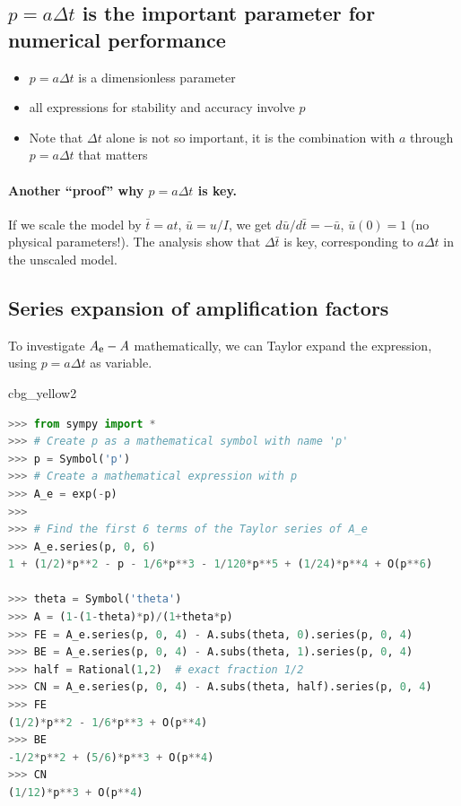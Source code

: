 \documentclass[%
oneside,                 %
final,                   %
10pt]{article}
\newenvironment{_cod_tight}[1]{
   \def\FrameCommand{\colorbox{#1}}
   \FrameRule0.6pt\MakeFramed {\FrameRestore}\vskip3mm}
   {\vskip0mm\endMakeFramed}
\newenvironment{cod}[1]{
\bgroup\rmfamily
\fboxsep=0mm\relax
\begin{_cod_tight}{#1}
\list{}{\parsep=-2mm\parskip=0mm\topsep=0pt\leftmargin=2mm
\rightmargin=2\leftmargin\leftmargin=4pt\relax}
\item\relax}
{\endlist\end{_cod_tight}\egroup}
\begin{document}
\subsection*{$p=a\Delta t$ is the important parameter for numerical performance}

\begin{itemize}
 \item $p=a\Delta t$ is a dimensionless parameter

 \item all expressions for stability and accuracy involve $p$

 \item Note that $\Delta t$ alone is not so important, it is the
   combination with $a$ through $p=a\Delta t$ that matters
\end{itemize}

\noindent

\paragraph{Another ``proof'' why $p=a\Delta t$ is key.}
If we scale the model
by $\bar t=at$, $\bar u=u/I$, we get
$d\bar u/d\bar t = -\bar u$, $\bar u(0)=1$ (no physical parameters!).
The analysis show that $\Delta \bar t$ is key, corresponding to
$a\Delta t$ in the unscaled model.



\subsection*{Series expansion of amplification factors}

To investigate $\Aex - A$ mathematically, we
can Taylor expand the expression, using $p=a\Delta t$ as variable.

\begin{cod}{cbg_yellow2}\begin{lstlisting}[language=Python,style=simple,xleftmargin=2mm]
>>> from sympy import *
>>> # Create p as a mathematical symbol with name 'p'
>>> p = Symbol('p')
>>> # Create a mathematical expression with p
>>> A_e = exp(-p)
>>>
>>> # Find the first 6 terms of the Taylor series of A_e
>>> A_e.series(p, 0, 6)
1 + (1/2)*p**2 - p - 1/6*p**3 - 1/120*p**5 + (1/24)*p**4 + O(p**6)

>>> theta = Symbol('theta')
>>> A = (1-(1-theta)*p)/(1+theta*p)
>>> FE = A_e.series(p, 0, 4) - A.subs(theta, 0).series(p, 0, 4)
>>> BE = A_e.series(p, 0, 4) - A.subs(theta, 1).series(p, 0, 4)
>>> half = Rational(1,2)  # exact fraction 1/2
>>> CN = A_e.series(p, 0, 4) - A.subs(theta, half).series(p, 0, 4)
>>> FE
(1/2)*p**2 - 1/6*p**3 + O(p**4)
>>> BE
-1/2*p**2 + (5/6)*p**3 + O(p**4)
>>> CN
(1/12)*p**3 + O(p**4)
\end{lstlisting}\end{cod}
\noindent
\end{document}
